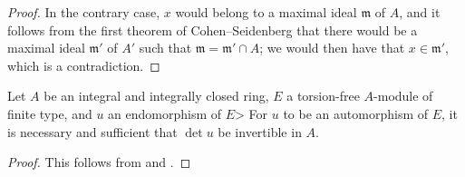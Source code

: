 \begin{proof}
In the contrary case, $x$ would belong to a maximal ideal $\mathfrak{m}$ of $A$, and it follows from the first theorem of Cohen--Seidenberg \cite[t.~I, p.~257, th.~3]{I-13} that there would be a maximal ideal $\mathfrak{m}'$ of $A'$ such that $\mathfrak{m}=\mathfrak{m}'\cap A$;
we would then have that $x\in\mathfrak{m}'$, which is a contradiction.
\end{proof}

\begin{corollary}[6.4.6]
\label{II.6.4.6}
Let $A$ be an integral and integrally closed ring, $E$ a torsion-free $A$-module of finite type, and $u$ an endomorphism of $E$>
For $u$ to be an automorphism of $E$, it is necessary and sufficient that $\det u$ be invertible in $A$.
\end{corollary}

\begin{proof}
This follows from  and .
\end{proof}

